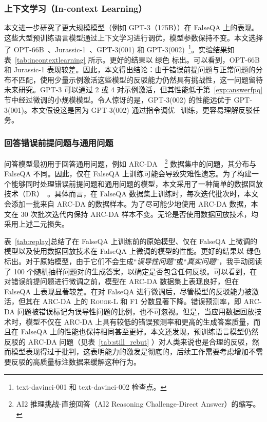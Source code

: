 \subsubsection{上下文学习（In-context Learning）}
本文进一步研究了更大规模模型（例如 GPT-3（175B））在 FalseQA 上的表现。这些大型预训练语言模型通过上下文学习进行调优，模型参数保持不变。本文选择了 {OPT-66B}~\cite{zhang2022opt}、Jurassic-1~\cite{lieber2021jurassic}、GPT-3(001) 和 GPT-3(002)~\footnote{text-davinci-001 和 text-davinci-002 检查点。}。实验结果如表~\ref{tab:incontextlearning} 所示。更好的结果以 \colorbox{emphcolor}{绿色} 标出。可以看到，OPT-66B 和 Jurassic-1 表现较差。因此，本文得出结论：由于错误前提问题与正常问题的分布不匹配，使用少量示例激活这些模型的反驳能力仍然具有挑战性，这一问题留待未来研究。GPT-3 可以通过 2 或 4 对示例激活，但其性能低于第~\ref{exp:answerfpq} 节中经过微调的小规模模型。令人惊讶的是，GPT-3(002) 的性能远优于 GPT-3(001)。本文假设这是因为 GPT-3(002) 通过指令调优~\cite{ouyang2022training} 训练，更容易理解反驳任务。


\subsubsection{回答错误前提问题与通用问题}
问答模型最初用于回答通用问题，例如 ARC-DA~\cite{bhakthavatsalam2021think}~\footnote{AI2 推理挑战-直接回答（AI2 Reasoning Challenge-Direct Answer）的缩写。} 数据集中的问题，其分布与 FalseQA 不同。因此，仅在 FalseQA 上训练可能会导致灾难性遗忘。为了构建一个能够同时处理错误前提问题和通用问题的模型，本文采用了一种简单的数据回放技术（DR）~\cite{chaudhry2019tiny}。具体而言，在 FalseQA 数据集上训练时，每次迭代批次时，本文会添加一批来自 ARC-DA 的数据样本。为了尽可能少地使用 ARC-DA 数据，本文在 30 次批次迭代内保持 ARC-DA 样本不变。无论是否使用数据回放技术，均采用上述二元损失。

表~\ref{tab:replay}总结了在 FalseQA 上训练前的原始模型、仅在 FalseQA 上微调的模型以及使用数据回放技术在 FalseQA 上微调的模型的性能。更好的结果以 \colorbox{emphcolor}{绿色} 标出。对于原始模型，由于它们不会生成“\textit{误导性问题}”或“\textit{真实问题}”，我手动阅读了 100 个随机抽样问题对的生成答案，以确定是否包含任何反驳。可以看到，在对错误前提问题进行微调之前，模型在 ARC-DA 数据集上表现良好，但在 FalseQA 上表现显著较差。在对 FalseQA 进行微调后，尽管模型的反驳能力被激活，但其在 ARC-DA 上的 \textsc{Rouge}-L 和 F1 分数显著下降。错误预测率，即 ARC-DA 问题被错误标记为误导性问题的比例，也不可忽视。但是，当应用数据回放技术时，模型不仅在 ARC-DA 上具有较低的错误预测率和更高的生成答案质量，而且在 FalseQA 上的性能也保持相同甚至更好。本文还发现，预训练语言模型仍然反驳的 ARC-DA 问题（见表~\ref{tab:still_rebut} ）对人类来说也是合理的反驳，然而模型表现得过于批判，这表明能力的激发是彻底的，后续工作需要考虑增加不需要反驳的高质量标注数据来缓解这种行为。

